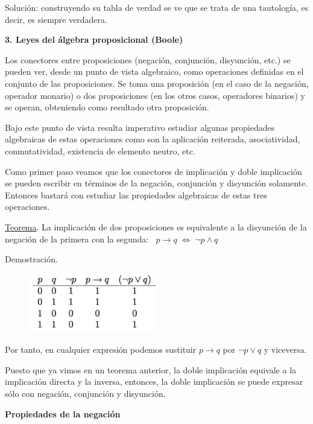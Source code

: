 \textcolor{gris}{Solución: construyendo su tabla de verdad se ve que se trata de una tautología, es decir, es siempre verdadera.}

\vspace{5mm}\textbf{3. Leyes del álgebra proposicional (Boole)}

Los conectores entre proposiciones (negación, conjunción, disyunción, etc.) se pueden ver, desde un punto de vista algebraico, como operaciones definidas en el conjunto de las proposiciones. Se toma una proposición (en el caso de la negación, operador monario) o dos proposiciones (en los otros casos, operadores binarios) y se operan, obteniendo como resultado otra proposición.

Bajo este punto de vista resulta imperativo estudiar algunas propiedades algebraicas de estas operaciones como son la aplicación reiterada, asociatividad, conmutatividad, existencia de elemento neutro, etc.

Como primer paso veamos que los conectores de implicación y doble implicación se pueden escribir en términos de la negación, conjunción y disyunción solamente. Entonces bastará con estudiar las propiedades algebraicas de estas tres operaciones. 

\underline{Teorema}. La implicación de dos proposiciones es equivalente a la disyunción de la negación de la primera con la segunda:
   $\; \; p \to q \; \Leftrightarrow \; \neg p \wedge q$

Demostración.
	\begin{figure}[H] 
		\centering
		\includegraphics[width=0.5\textwidth]{imagenes/apendices/APENDICESIM22.png}
	\end{figure}

\rightline{$\Box$}	


Por tanto, en cualquier expresión podemos sustituir $p \to q$ por $\neg p \vee q$ y viceversa.

Puesto que ya vimos en un teorema anterior, la doble implicación  equivale a la implicación directa y la inversa, entonces, la doble implicación se puede expresar sólo con negación, conjunción y disyunción.

\textbf{Propiedades de la negación}

